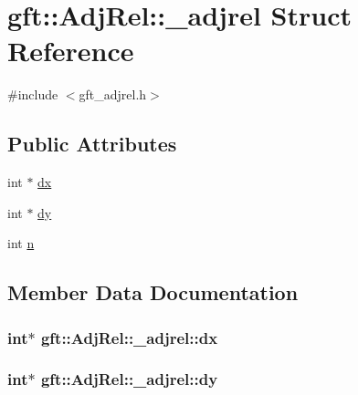 \hypertarget{structgft_1_1AdjRel_1_1__adjrel}{}\section{gft\+:\+:Adj\+Rel\+:\+:\+\_\+adjrel Struct Reference}
\label{structgft_1_1AdjRel_1_1__adjrel}


{\ttfamily \#include $<$gft\+\_\+adjrel.\+h$>$}

\subsection*{Public Attributes}
\begin{DoxyCompactItemize}
\item 
int $\ast$ \hyperlink{structgft_1_1AdjRel_1_1__adjrel_ace7ee2f2817026586276cc2f91678c41}{dx}
\item 
int $\ast$ \hyperlink{structgft_1_1AdjRel_1_1__adjrel_affcd3ebc7e12319eb38e4103dea77d04}{dy}
\item 
int \hyperlink{structgft_1_1AdjRel_1_1__adjrel_a2728c9b893dfb77f919d79963cda39d8}{n}
\end{DoxyCompactItemize}


\subsection{Member Data Documentation}
\subsubsection[{\texorpdfstring{dx}{dx}}]{\setlength{\rightskip}{0pt plus 5cm}int$\ast$ gft\+::\+Adj\+Rel\+::\+\_\+adjrel\+::dx}\hypertarget{structgft_1_1AdjRel_1_1__adjrel_ace7ee2f2817026586276cc2f91678c41}{}\label{structgft_1_1AdjRel_1_1__adjrel_ace7ee2f2817026586276cc2f91678c41}
\subsubsection[{\texorpdfstring{dy}{dy}}]{\setlength{\rightskip}{0pt plus 5cm}int$\ast$ gft\+::\+Adj\+Rel\+::\+\_\+adjrel\+::dy}\hypertarget{structgft_1_1AdjRel_1_1__adjrel_affcd3ebc7e12319eb38e4103dea77d04}{}\label{structgft_1_1AdjRel_1_1__adjrel_affcd3ebc7e12319eb38e4103dea77d04}
